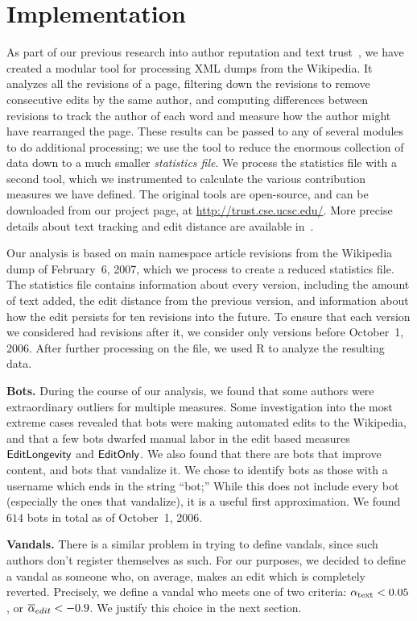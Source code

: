 \section{Implementation}

As part of our previous research into author reputation
and text trust~\cite{www07,trust-techrep-07}, we have
created a modular tool for processing XML dumps from
the Wikipedia.
It analyzes all the revisions of a page,
filtering down the revisions to remove consecutive edits
by the same author, and computing differences between
revisions to track the author of each word and measure
how the author might have rearranged the page.
These results can be passed to any of several
modules to do additional processing; we use the tool
to reduce the enormous collection of data down to
a much smaller \textit{statistics file}.
We process the statistics file with a second tool,
which we instrumented to calculate the various
contribution measures we have defined.
The original tools are open-source, and can be downloaded
from our project page, at \url{http://trust.cse.ucsc.edu/}.
More precise details about text tracking and edit distance
are available in~\cite{www07}.

Our analysis is based on main namespace article revisions from
the Wikipedia dump of February~6, 2007,
which we process to create a reduced statistics file.
The statistics file contains information about every version,
including the amount of text added, the edit distance from
the previous version, and information about how the edit
persists for ten revisions into the future.
To ensure that each version we considered had revisions
after it, we consider only versions before October~1, 2006.
After further processing on the file,
we used R\cite{R2007} to analyze the resulting data.

\textbf{Bots.}
During the course of our analysis, we found that
some authors were extraordinary outliers for multiple measures.
Some investigation into the most extreme cases revealed
that bots were making automated edits to the Wikipedia,
and that a few bots dwarfed manual labor in the edit based
measures $\mathsf{EditLongevity}$ and $\mathsf{EditOnly}$.
We also found that there are bots that improve content,
and bots that vandalize it.
We chose to identify bots as those with a username which
ends in the string ``bot;''
While this does not include every bot (especially
the ones that vandalize), it is a useful first approximation.
We found $614$ bots in total as of October~1, 2006.

\textbf{Vandals.}
There is a similar problem in trying to define vandals,
since such authors don't register themselves as such.
For our purposes, we decided to define a vandal
as someone who, on average, makes an edit which is
completely reverted.
Precisely, we define a vandal who meets one of two criteria:
$\alpha_\text{text} < 0.05$, or ${\overline{\alpha}}_{edit} < -0.9$.
We justify this choice in the next section.
